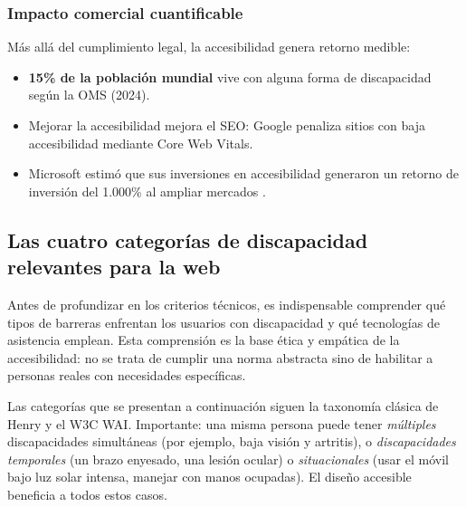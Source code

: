 \documentclass[11pt,a4paper,openany]{book}
\begin{document}
\subsubsection{Impacto comercial cuantificable}

Más allá del cumplimiento legal, la accesibilidad genera retorno
medible:

\begin{itemize}
\item \textbf{15\% de la población mundial} vive con alguna forma de
discapacidad según la OMS (2024).
\item Mejorar la accesibilidad mejora el SEO: Google penaliza sitios
con baja accesibilidad mediante Core Web Vitals.
\item Microsoft estimó que sus inversiones en accesibilidad
generaron un retorno de inversión del 1.000\% al ampliar mercados
\cite{microsoft2020inclusive}.
\end{itemize}

\subsection{Las cuatro categorías de discapacidad relevantes para la web}

Antes de profundizar en los criterios técnicos, es indispensable
comprender qué tipos de barreras enfrentan los usuarios con
discapacidad y qué tecnologías de asistencia emplean. Esta
comprensión es la base ética y empática de la accesibilidad: no se
trata de cumplir una norma abstracta sino de habilitar a personas
reales con necesidades específicas.

Las categorías que se presentan a continuación siguen la taxonomía
clásica de Henry \cite{henry2018accessibility} y el W3C WAI.
Importante: una misma persona puede tener \emph{múltiples}
discapacidades simultáneas (por ejemplo, baja visión y artritis), o
\emph{discapacidades temporales} (un brazo enyesado, una lesión
ocular) o \emph{situacionales} (usar el móvil bajo luz solar
intensa, manejar con manos ocupadas). El diseño accesible beneficia
a todos estos casos.
\end{document}
